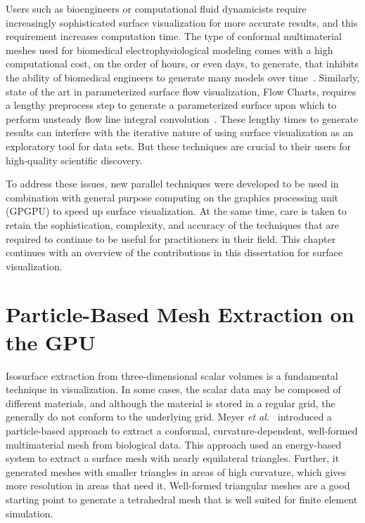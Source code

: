 Users such as bioengineers or computational fluid dynamicists require increasingly sophisticated surface visualization for more accurate results, and this requirement increases computation time. The type of conformal multimaterial meshes used for biomedical electrophysiological modeling comes with a high computational cost, on the order of hours, or even days, to generate, that inhibits the ability of biomedical engineers to generate many models over time~\cite{Swe2012}. Similarly, state of the art in parameterized surface flow visualization, Flow Charts, requires a lengthy preprocess step to generate a parameterized surface upon which to perform unsteady flow line integral convolution~\cite{10.1109/TVCG.2008.58}. These lengthy times to generate results can interfere with the iterative nature of using surface visualization as an exploratory tool for data sets. But these techniques are crucial to their users for high-quality scientific discovery.

To address these issues, new parallel techniques were developed to be used in combination with general purpose computing on the graphics processing unit (GPGPU) to speed up surface visualization. At the same time, care is taken to retain the sophistication, complexity, and accuracy of the techniques that are required to continue to be useful for practitioners in their field.  This chapter continues with an overview of the contributions in this dissertation for surface visualization.

\section{Particle-Based Mesh Extraction on the GPU}
Isosurface extraction from three-dimensional scalar volumes is a fundamental technique in visualization. In some cases, the scalar data may be composed of different materials, and although the material is stored in a regular grid, the  generally do not conform to the underlying grid. Meyer \textit{et al.}~\cite{SCI:Mey2007b,SCI:Mey2008a} introduced a particle-based approach to extract a conformal, curvature-dependent, well-formed multimaterial mesh from biological data. This approach used an energy-based system to extract a surface mesh with nearly equilateral triangles. Further, it generated meshes with smaller triangles in areas of high curvature, which gives more resolution in areas that need it. Well-formed triangular meshes are a good starting point to generate a tetrahedral mesh that is well suited for finite element simulation.

